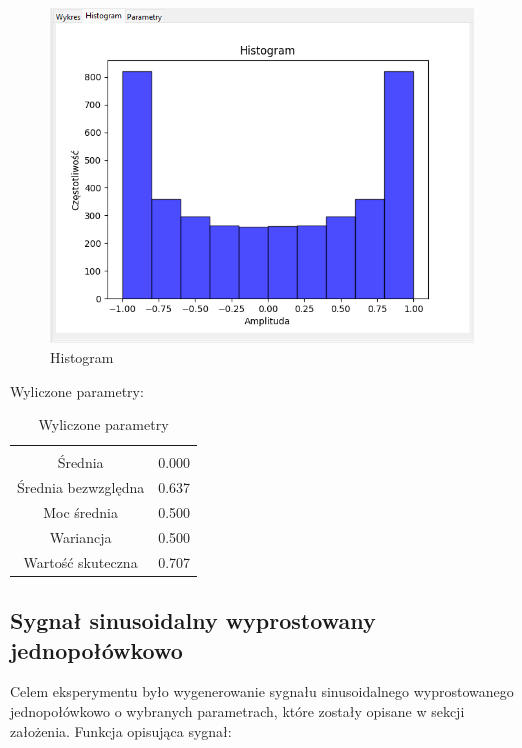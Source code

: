 \documentclass{article}
\begin{document}
\begin{figure}[h!]
    \centering
    \includegraphics[width=\textwidth]{img/sinus/hist.png}
    \caption{Histogram}
\end{figure}
\FloatBarrier
Wyliczone parametry:
\begin{table}[h!]
    \centering
    \vspace{0.2cm}
    \begin{tabular}{|c|c|}
        \hline\hline\\[-0.4cm]
        Średnia & 0.000  \\
        \hline
        Średnia bezwzględna & 0.637  \\
        \hline
        Moc średnia & 0.500  \\
        \hline
        Wariancja & 0.500 \\
        \hline
        Wartość skuteczna & 0.707 \\
        \hline
    \end{tabular}
    \caption{Wyliczone parametry}
    \label{sinus}
\end{table}

\subsection{Sygnał sinusoidalny wyprostowany jednopołówkowo} \label{sinusjednopolowkowy} 
Celem eksperymentu było wygenerowanie sygnału sinusoidalnego wyprostowanego jednopołówkowo o wybranych parametrach,
które zostały opisane w sekcji założenia. Funkcja opisująca sygnał:
\end{document}
